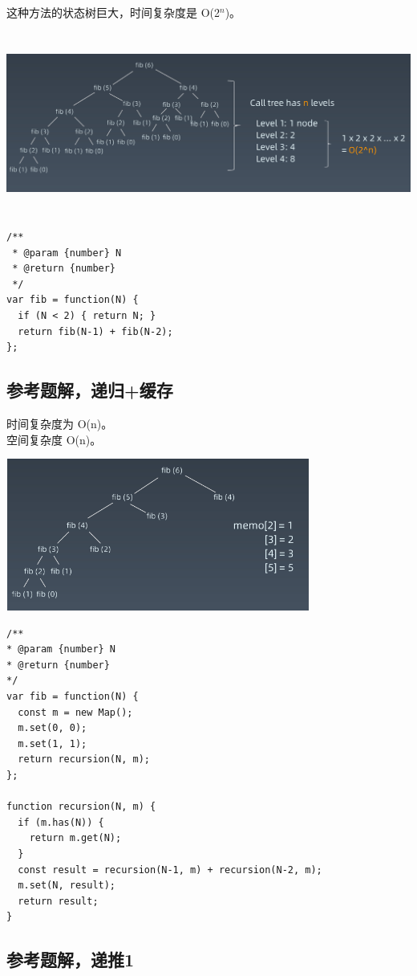 这种方法的状态树巨大，时间复杂度是 O(2$^{n}$)。

\includegraphics[width=140mm,height=60mm]{images/leetcode/leetcode_509_01.png}

\begin{verbatim}
/**
 * @param {number} N
 * @return {number}
 */
var fib = function(N) {
  if (N < 2) { return N; }
  return fib(N-1) + fib(N-2);
};
\end{verbatim}

\subsection{参考题解，递归+缓存}

时间复杂度为 O(n)。\\
空间复杂度 O(n)。

\includegraphics[width=100mm,height=50mm]{images/leetcode/leetcode_509_02.png}

\begin{verbatim}
/**
* @param {number} N
* @return {number}
*/
var fib = function(N) {
  const m = new Map();
  m.set(0, 0);
  m.set(1, 1);
  return recursion(N, m);
};

function recursion(N, m) {
  if (m.has(N)) {
    return m.get(N);
  }
  const result = recursion(N-1, m) + recursion(N-2, m);
  m.set(N, result);
  return result;
}
\end{verbatim}

\subsection{参考题解，递推1}

